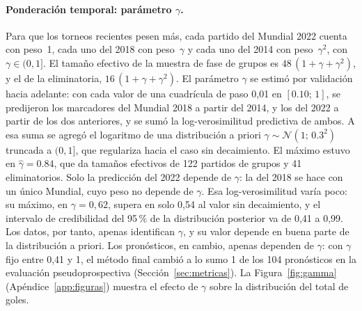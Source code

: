 \documentclass[12pt]{article}
\theoremstyle{plain}
\theoremstyle{remark}
\begin{document}
\paragraph{Ponderación temporal: parámetro $\gamma$.}
Para que los torneos recientes pesen más, cada partido del Mundial
2022 cuenta con peso~1, cada uno del 2018 con peso~$\gamma$ y cada
uno del 2014 con peso~$\gamma^2$, con $\gamma \in (0, 1]$.
El tamaño efectivo de la muestra de fase de grupos es
$48\,(1 + \gamma + \gamma^2)$, y el de la eliminatoria,
$16\,(1 + \gamma + \gamma^2)$.
El parámetro $\gamma$ se estimó por validación hacia adelante: con
cada valor de una cuadrícula de paso 0,01 en $[0.10;\, 1]$, se
predijeron los marcadores del Mundial 2018 a partir del 2014, y los del
2022 a partir de los dos anteriores, y se sumó la log-verosimilitud
predictiva de ambos.
A esa suma se agregó el logaritmo de una distribución a priori
$\gamma \sim \mathcal{N}(1;\, 0.3^2)$ truncada a $(0, 1]$, que regulariza
hacia el caso sin decaimiento.
El máximo estuvo en $\hat{\gamma} = 0.84$, que da tamaños efectivos de
122 partidos de grupos y 41 eliminatorios.
Solo la predicción del 2022 depende de $\gamma$: la del 2018 se hace
con un único Mundial, cuyo peso no depende de $\gamma$.
Esa log-verosimilitud varía poco: su máximo, en $\gamma = 0{,}62$,
supera en solo 0,54 al valor sin decaimiento, y el intervalo de
credibilidad del 95\,\% de la distribución posterior va de 0,41 a
0,99.
Los datos, por tanto, apenas identifican $\gamma$, y su valor depende
en buena parte de la distribución a priori.
Los pronósticos, en cambio, apenas dependen de $\gamma$: con $\gamma$
fijo entre 0,41 y 1, el método final cambió a lo sumo 1 de los 104
pronósticos en la evaluación pseudoprospectiva
(Sección~\ref{sec:metricas}).
La Figura~\ref{fig:gamma} (Apéndice~\ref{app:figuras}) muestra el
efecto de $\gamma$ sobre la
distribución del total de goles.
\end{document}
